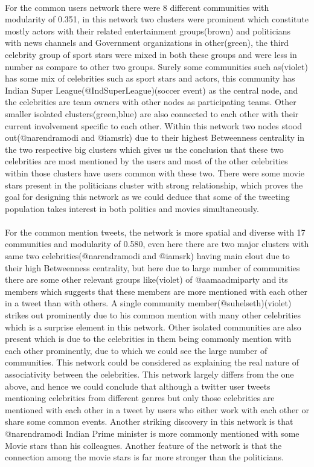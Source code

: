 \documentclass[runningheads,a4paper]{llncs}
\begin{document}
\paragraph{}
For the common users network there were 8 different communities with modularity of 0.351, in this network two clusters were prominent which constitute mostly actors with their related entertainment groups(brown) and politicians with news channels and Government organizations in other(green), the third celebrity group of sport stars were mixed in both these groups and were less in number as compare to other two groups. Surely some communities such as(violet) has some mix of celebrities such as sport stars and actors, this community has Indian Super League(@IndSuperLeague)(soccer event) as the central node, and the celebrities are team owners with other nodes as participating teams. Other smaller isolated clusters(green,blue) are also connected to each other with their current involvement specific to each other. Within this network two nodes stood out(@narendramodi and @iamsrk) due to their highest Betweenness centrality in the two respective big clusters which gives us the conclusion that these two celebrities are most mentioned by the users and most of the other celebrities within those clusters have users common with these two. There were some movie stars present in the politicians cluster with strong relationship, which proves the goal for designing this network as we could deduce that some of the tweeting population takes interest in both politics and movies simultaneously.

\paragraph{}
For the common mention tweets, the network is more spatial and diverse with 17 communities and modularity of 0.580, even here there are two major clusters with same two celebrities(@narendramodi and @iamsrk) having main clout due to their high Betweenness centrality, but here due to large number of communities there are some other relevant groups like(violet) of @aamaadmiparty and its members which suggests that these members are more mentioned with each other in a tweet than with others. A single community member(@suhelseth)(violet) strikes out prominently due to his common mention with many other celebrities which is a surprise element in this network. Other isolated communities are also present which is due to the celebrities in them being commonly mention with each other prominently, due to which we could see the large number of communities. This network could be considered as explaining the real nature of associativity between the celebrities. This network largely differs from the one above, and hence we could conclude that although a twitter user tweets mentioning celebrities from different genres but only those celebrities are mentioned with each other in a tweet by users who either work with each other or share some common events. Another striking discovery in this network is that @narendramodi Indian Prime minister is more commonly mentioned with some Movie stars than his colleagues. Another feature of the network is that the connection among the movie stars is far more stronger than the politicians.
\end{document}

